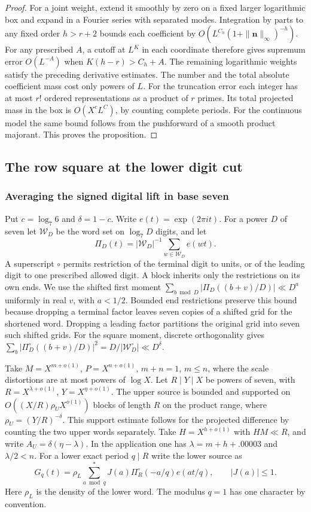 \documentclass[11pt,a4paper]{article}
\theoremstyle{paperplain}
\numberwithin{equation}{section}
\begin{document}
\begin{proof}
For a joint weight, extend it smoothly by zero on a fixed larger
logarithmic box and expand in a Fourier series with separated modes.
Integration by parts to any fixed order \(h>r+2\) bounds each
coefficient by \(O(L^{C_h}(1+\|\mathbf n\|_\infty)^{-h})\).
For any prescribed \(A\), a cutoff at \(L^{K}\) in each coordinate
therefore gives supremum error \(O(L^{-A})\) when
\(K(h-r)>C_h+A\). The remaining
logarithmic weights satisfy the preceding derivative estimates. The
number and the total absolute coefficient mass cost only powers of
\(L\). For the truncation error each integer has at most \(r!\)
ordered representations as a product of \(r\) primes. Its total
projected mass in the box is \(O(X^cL^{C})\), by counting complete
periods. For the continuous model the same bound follows from the
pushforward of a smooth product majorant. This proves the proposition.
\end{proof}


\subsection{The row square at the lower digit cut}

\subsubsection{Averaging the signed digital lift in base seven}
\label{sec:seven-signed-lift}

Put $c=\log_7 6$ and $\delta=1-c$. Write $e(t)=\exp(2\pi i t)$.
For a power $D$ of seven let $\mathcal W_D$ be the word set on
$\log_7D$ digits, and let
\[
 \Pi_D(t)=|\mathcal W_D|^{-1}\sum_{w\in\mathcal W_D}e(wt).
\]
A superscript $\circ$ permits restriction of the terminal digit to units,
or of the leading digit to one prescribed allowed digit. A block inherits
only the restrictions on its own ends. We use the shifted first moment
$\sum_{b\bmod D}|\Pi_D((b+v)/D)|\ll D^a$ uniformly in real $v$, with
$a<1/2$. Bounded end restrictions preserve this bound because dropping a terminal
factor leaves seven copies of a shifted grid for the shortened word. Dropping
a leading factor partitions the original grid into seven such shifted grids.
For the square moment, discrete orthogonality gives
$\sum_b|\Pi_D^\circ((b+v)/D)|^2=D/|\mathcal W_D^\circ|\ll D^\delta$.

Take $M=X^{m+o(1)}$, $P=X^{n+o(1)}$, $m+n=1$, $m\le n$, where
the scale distortions are at most powers of $\log X$. Let $R\mid Y\mid X$
be powers of seven, with $R=X^{\lambda+o(1)}$, $Y=X^{\eta+o(1)}$.
The upper source is bounded and supported on
$O((X/R)\rho_U X^{o(1)})$ blocks of length $R$ on the product range,
where $\rho_U=(Y/R)^{-\delta}$. This support estimate follows for the
projected difference by counting the two upper words separately.
Take $H=X^{h+o(1)}$ with $HM\ll R$,
and write $A_U=\delta(\eta-\lambda)$. In the application one has
$\lambda=m+h+.00003$ and $\lambda/2<n$. For a lower exact period $q\mid R$
write the lower source as
\[
 G_q(t)=\rho_L\sum_{a\bmod q}^{*} J(a)\Pi_R^\circ(-a/q)e(at/q),
             \qquad |J(a)|\le1.
\]
Here $\rho_L$ is the density of the lower word. The modulus $q=1$ has
one character by convention.
\end{document}
